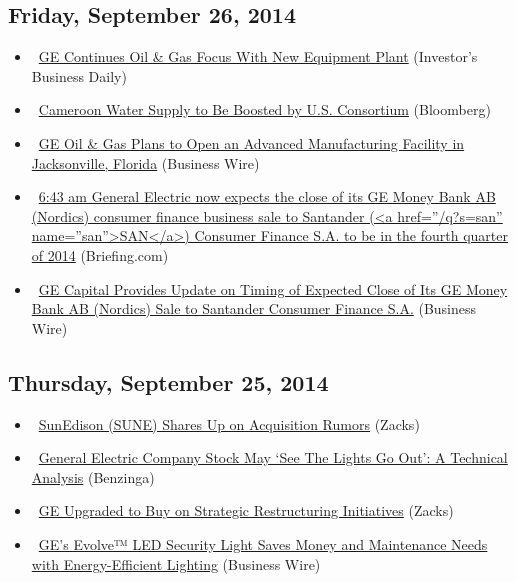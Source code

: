 \documentclass[11pt,asymmetric]{article}
\begin{document}
\subsection*{Friday, September 26, 2014}
\begin{itemize}
\item\ \href{http://news.investors.com/092614-719168-general-electric-focuses-on-industrial-business.htm?ven=yahoocp&src=aurlled&ven=yahoo}{GE Continues Oil \& Gas Focus With New Equipment Plant} (Investor's Business Daily)
\item\ \href{http://www.bloomberg.com/news/2014-09-26/cameroon-water-supply-to-be-boosted-by-u-s-consortium.html?cmpid=yhoo}{Cameroon Water Supply to Be Boosted by U.S. Consortium} (Bloomberg)
\item\ \href{http://finance.yahoo.com/news/ge-oil-gas-plans-open-140000325.html}{GE Oil \& Gas Plans to Open an Advanced Manufacturing Facility in Jacksonville, Florida} (Business Wire)
\item\ \href{http://finance.yahoo.com/news/inplay-briefing-com-055139997.html#ge}{6:43 am General Electric now expects the close of its GE Money Bank AB (Nordics) consumer finance business sale to Santander (<a href=''/q?s=san'' name=''san''>SAN</a>) Consumer Finance S.A. to be in the fourth quarter of 2014} (Briefing.com)
\item\ \href{http://finance.yahoo.com/news/ge-capital-provides-timing-expected-103000555.html}{GE Capital Provides Update on Timing of Expected Close of Its GE Money Bank AB (Nordics) Sale to Santander Consumer Finance S.A.} (Business Wire)
\end{itemize}
\subsection*{Thursday, September 25, 2014}
\begin{itemize}
\item\ \href{http://finance.yahoo.com/news/sunedison-sune-shares-acquisition-rumors-172002587.html}{SunEdison (SUNE) Shares Up on Acquisition Rumors} (Zacks)
\item\ \href{http://finance.yahoo.com/news/general-electric-company-stock-may-153237562.html}{General Electric Company Stock May `See The Lights Go Out': A Technical Analysis} (Benzinga)
\item\ \href{http://finance.yahoo.com/news/ge-upgraded-buy-strategic-restructuring-144445042.html}{GE Upgraded to Buy on Strategic Restructuring Initiatives} (Zacks)
\item\ \href{http://finance.yahoo.com/news/ge-evolve-led-security-light-143100006.html}{GE’s Evolve™ LED Security Light Saves Money and Maintenance Needs with Energy-Efficient Lighting} (Business Wire)
\end{itemize}
\end{document}
